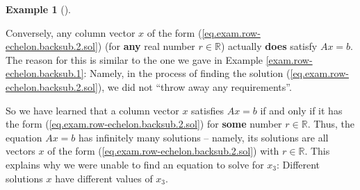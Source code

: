 \documentclass[numbers=enddot,12pt,final,onecolumn,notitlepage]{scrartcl}%
\theoremstyle{definition}
\newtheorem{exam}[theo]{Example}
\newenvironment{example}[1][]
{\begin{exam}[#1]\begin{leftbar}}
{\end{leftbar}\end{exam}}
\begin{document}
\begin{example}
Conversely, any column vector $x$ of the form
(\ref{eq.exam.row-echelon.backsub.2.sol}) (for \textbf{any} real number
$r\in\mathbb{R}$) actually \textbf{does} satisfy $Ax=b$. The reason for this
is similar to the one we gave in Example \ref{exam.row-echelon.backsub.1}:
Namely, in the process of finding the solution
(\ref{eq.exam.row-echelon.backsub.2.sol}), we did not \textquotedblleft throw
away any requirements\textquotedblright.

So we have learned that a column vector $x$ satisfies $Ax=b$ if and only if it
has the form (\ref{eq.exam.row-echelon.backsub.2.sol}) for \textbf{some}
number $r\in\mathbb{R}$. Thus, the equation $Ax=b$ has infinitely many
solutions -- namely, its solutions are all vectors $x$ of the form
(\ref{eq.exam.row-echelon.backsub.2.sol}) with $r\in\mathbb{R}$. This explains
why we were unable to find an equation to solve for $x_{3}$: Different
solutions $x$ have different values of $x_{3}$.
\end{example}
\end{document}
